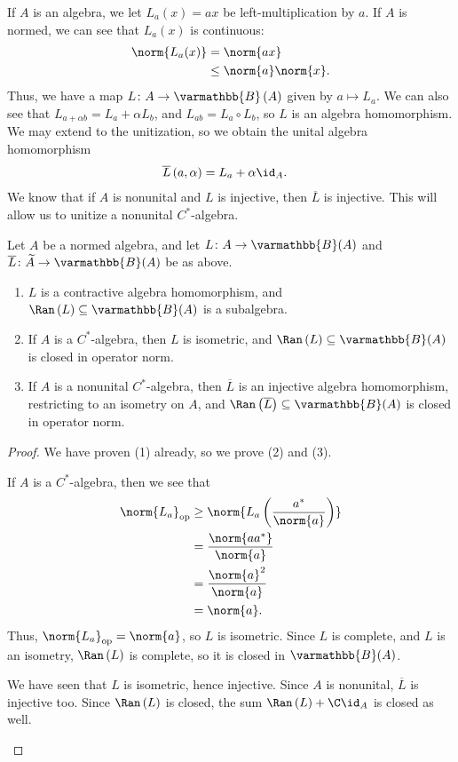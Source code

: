 \documentclass[10pt]{mypackage}
\renewcommand*{\mathbb}[1]{\varmathbb{#1}}
\newcommand{\B}{\mathbb{B}}
\DeclareMathOperator{\op}{op}
\begin{document}
If $A$ is an algebra, we let $L_a(x) = ax$ be left-multiplication by $a$. If $A$ is normed, we can see that $L_a(x)$ is continuous:
\begin{align*}
  \norm{L_a(x)} &= \norm{ax}\\
                &\leq \norm{a}\norm{x}.
\end{align*}
Thus, we have a map $L\colon A\rightarrow \B\left(A\right)$ given by $a\mapsto L_a$. We can also see that $L_{a + \alpha b} = L_a + \alpha L_b$, and $L_{ab} = L_a\circ L_b$, so $L$ is an algebra homomorphism. We may extend to the unitization, so we obtain the unital algebra homomorphism
\begin{align*}
  \overline{L}\left(a,\alpha\right) &= L_a + \alpha \id_A.
\end{align*}
We know that if $A$ is nonunital and $L$ is injective, then $\overline{L}$ is injective. This will allow us to unitize a nonunital $C^{\ast}$-algebra.
\begin{lemma}
  Let $A$ be a normed algebra, and let $L\colon A\rightarrow \B(A)$ and $\overline{L}\colon \widetilde{A}\rightarrow \B(A)$ be as above.
  \begin{enumerate}[(1)]
    \item $L$ is a contractive algebra homomorphism, and $\Ran\left(L\right)\subseteq \B(A)$ is a subalgebra.
    \item If $A$ is a $C^{\ast}$-algebra, then $L$ is isometric, and $\Ran\left(L\right)\subseteq \B(A)$ is closed in operator norm.
    \item If $A$ is a nonunital $C^{\ast}$-algebra, then $\overline{L}$ is an injective algebra homomorphism, restricting to an isometry on $A$, and $\Ran\left(\overline{L}\right)\subseteq \B(A)$ is closed in operator norm.
  \end{enumerate}
\end{lemma}
\begin{proof}
  We have proven (1) already, so we prove (2) and (3).
  \begin{description}[font=\normalfont]
    \item[(2)] If $A$ is a $C^{\ast}$-algebra, then we see that
      \begin{align*}
        \norm{L_a}_{\op} &\geq \norm{L_a\left(\frac{a^{\ast}}{\norm{a}}\right)}\\
                         &= \frac{\norm{aa^{\ast}}}{\norm{a}}\\
                         &= \frac{\norm{a}^2}{\norm{a}}\\
                         &= \norm{a}.
      \end{align*}
      Thus, $\norm{L_a}_{\op} = \norm{a}$, so $L$ is isometric. Since $L$ is complete, and $L$ is an isometry, $\Ran\left(L\right)$ is complete, so it is closed in $\B(A)$.
    \item We have seen that $L$ is isometric, hence injective. Since $A$ is nonunital, $\overline{L}$ is injective too. Since $\Ran\left(L\right)$ is closed, the sum $\Ran\left(L\right) + \C\id_{A}$ is closed as well.
  \end{description}
\end{proof}
\end{document}
